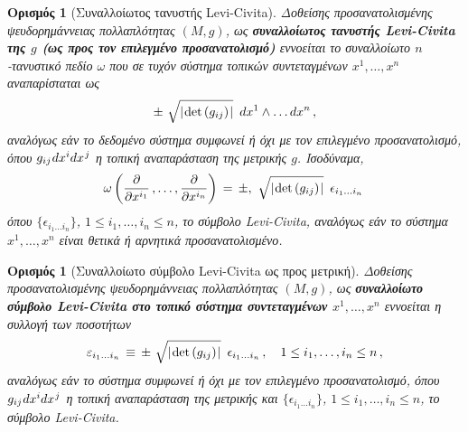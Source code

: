 \documentclass[11pt,a4paper,twoside,openright]{book}
\newtheorem{definition}[lemma]{Ορισμός}
\begin{document}
\begin{definition}[Συναλλοίωτος τανυστής Levi-Civita]
	\label{def:covariant-levi-civita}
Δοθείσης προσανατολισμένης ψευδορημάννειας πολλαπλότητας $(M, g)$,
ως \textbf{συναλλοίωτος τανυστής Levi-Civita της $g$ (ως προς τον επιλεγμένο προσανατολισμό)} εννοείται το συναλλοίωτο $n$-τανυστικό πεδίο $\omega$
που σε τυχόν σύστημα τοπικών συντεταγμένων
$x^1, \dots, x^n$ αναπαρίσταται ως
\begin{equation}\label{eq:covariant-levi-civita}
\pm \,\,\sqrt{\lvert\hspace{.75pt} \det \left(g_{ij}\right) \hspace{.75pt}\rvert}
\,\,\,
dx^1 \wedge \dots dx^n\,,
\end{equation}
αναλόγως εάν το δεδομένο σύστημα συμφωνεί ή όχι με τον επιλεγμένο προσανατολισμό,
όπου $g_{ij}\hspace{.5pt}dx^i dx^{\hspace{.5pt}j}$
η τοπική αναπαράσταση της μετρικής $g$.
Ισοδύναμα,
\begin{equation}\label{eq:eq:covariant-levi-civita-evaluation}
\omega
\left(
\frac{\partial}{\partial x^{i_1}}\,,
\dots,
\frac{\partial}{\partial x^{i_n}}
\right)
\,
=
\,
\pm
,\
\sqrt{\lvert\hspace{.75pt} \det \left(g_{ij}\right) \hspace{.75pt}\rvert}
\,\,\,
\epsilon_{i_1 \dots i_n}\,
\end{equation}
όπου $\{\epsilon_{i_1 \dots i_n}\}$, $1 \le i_1, \dots, i_n \le n$,
το σύμβολο Levi-Civita, αναλόγως εάν το σύστημα $x^1, \dots, x^n$
είναι θετικά ή αρνητικά προσανατολισμένο.
\end{definition}

\begin{definition}[Συναλλοίωτο σύμβολο Levi-Civita ως προς μετρική]
	\label{def:covariant-levi-civita-symbol}
Δοθείσης προσανατολισμένης ψευδορημάννειας πολλαπλότητας $(M, g)$,
ως \textbf{συναλλοίωτο σύμβολο Levi-Civita στο τοπικό σύστημα συντεταγμένων
$x^1, \dots, x^n$} εννοείται η συλλογή των ποσοτήτων
\begin{equation}\label{eq:eq:covariant-levi-civita-symbol}
\varepsilon_{i_1 \dots i_n}
\,
\equiv
\,
\pm \,\,
\sqrt{\lvert\hspace{.75pt} \det \left(g_{ij}\right) \hspace{.75pt}\rvert}
\,\,\,
\epsilon_{i_1 \dots i_n}\,,
\quad
1 \le i_1, \dots, i_n \le n\,,
\end{equation}
αναλόγως εάν το σύστημα συμφωνεί ή όχι με τον επιλεγμένο προσανατολισμό,
όπου $g_{ij}\hspace{.5pt}dx^i dx^{\hspace{.5pt}j}$
η τοπική αναπαράσταση της μετρικής και
$\{\epsilon_{i_1 \dots i_n}\}$, $1 \le i_1, \dots, i_n \le n$,
το σύμβολο Levi-Civita.
\end{definition}
\end{document}
